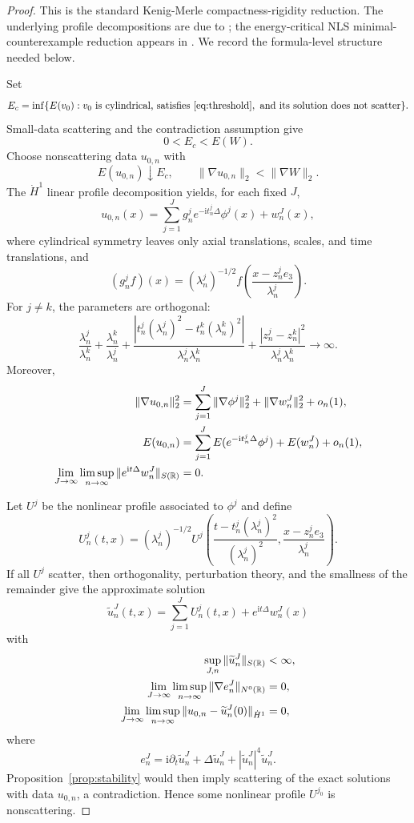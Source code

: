 \documentclass[preprint,12pt]{elsarticle}
\numberwithin{equation}{section}
\newcommand{\R}{\mathbb R}
\newcommand{\ii}{\mathrm i}
\newcommand{\na}{\nabla}
\newcommand{\pa}{\partial}
\newcommand{\ez}{e_3}
\theoremstyle{remark}
\begin{document}
\begin{proof}
This is the standard Kenig-Merle compactness-rigidity reduction.  The underlying profile decompositions are due to \cite{Gerard1998,BahouriGerard1999,Keraani2001}; the energy-critical NLS minimal-counterexample reduction appears in \cite{KenigMerle2006,CollianderKeelStaffilaniTakaokaTao2008}.  We record the formula-level structure needed below.

Set
\[
  E_c=\inf\{E(v_0): v_0\text{ is cylindrical, satisfies }\eqref{eq:threshold},
  \text{ and its solution does not scatter}\}.
\]
Small-data scattering and the contradiction assumption give
\[
  0<E_c<E(W).
\]
Choose nonscattering data $u_{0,n}$ with
\[
  E(u_{0,n})\downarrow E_c,
  \qquad \|\na u_{0,n}\|_2<\|\na W\|_2.
\]
The $\dot H^1$ linear profile decomposition yields, for each fixed $J$,
\[
  u_{0,n}(x)=\sum_{j=1}^J g_n^j e^{-\ii t_n^j\Delta}\phi^j(x)+w_n^J(x),
\]
where cylindrical symmetry leaves only axial translations, scales, and time translations, and
\[
  (g_n^j f)(x)=(\lambda_n^j)^{-1/2}
  f\left(\frac{x-z_n^j\ez}{\lambda_n^j}\right).
\]
For $j\ne k$, the parameters are orthogonal:
\[
 \frac{\lambda_n^j}{\lambda_n^k}+\frac{\lambda_n^k}{\lambda_n^j}
 +\frac{|t_n^j(\lambda_n^j)^2-t_n^k(\lambda_n^k)^2|}{\lambda_n^j\lambda_n^k}
 +\frac{|z_n^j-z_n^k|^2}{\lambda_n^j\lambda_n^k}\to\infty.
\]
Moreover,
\begin{align}
  \|\na u_{0,n}\|_2^2
  &=\sum_{j=1}^J\|\na\phi^j\|_2^2+\|\na w_n^J\|_2^2+o_n(1),\notag\\
  E(u_{0,n})
  &=\sum_{j=1}^J E(e^{-\ii t_n^j\Delta}\phi^j)+E(w_n^J)+o_n(1),\label{eq:profile-energy-v8}\\
  \lim_{J\to\infty}\limsup_{n\to\infty}
  \|e^{\ii t\Delta}w_n^J\|_{S(\R)}&=0.\notag
\end{align}

Let $U^j$ be the nonlinear profile associated to $\phi^j$ and define
\[
  U_n^j(t,x)=(\lambda_n^j)^{-1/2}
  U^j\left(\frac{t-t_n^j(\lambda_n^j)^2}{(\lambda_n^j)^2},
  \frac{x-z_n^j\ez}{\lambda_n^j}\right).
\]
If all $U^j$ scatter, then orthogonality, perturbation theory, and the smallness of the remainder give the approximate solution
\[
  \widetilde u_n^J(t,x)=\sum_{j=1}^J U_n^j(t,x)+e^{\ii t\Delta}w_n^J(x)
\]
with
\begin{align}
  \sup_{J,n}\|\widetilde u_n^J\|_{S(\R)}&<\infty,\label{eq:approx-S-v8}\\
  \lim_{J\to\infty}\limsup_{n\to\infty}
  \|\na e_n^J\|_{N^0(\R)}&=0,\notag\\
  \lim_{J\to\infty}\limsup_{n\to\infty}
  \|u_{0,n}-\widetilde u_n^J(0)\|_{\dot H^1}&=0,\label{eq:approx-data-v8}
\end{align}
where
\[
  e_n^J=\ii\pa_t\widetilde u_n^J+\Delta\widetilde u_n^J+|\widetilde u_n^J|^4\widetilde u_n^J.
\]
Proposition~\ref{prop:stability} would then imply scattering of the exact solutions with data $u_{0,n}$, a contradiction.  Hence some nonlinear profile $U^{j_0}$ is nonscattering.


\end{proof}
\end{document}
